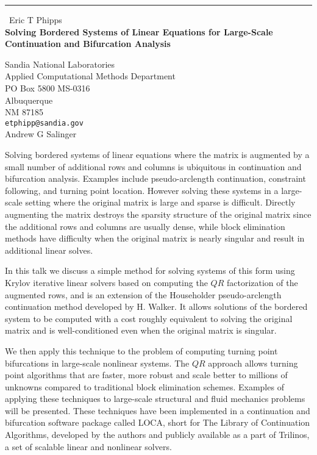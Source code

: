 \documentclass{report}
\begin{document}
\begin{center}
\rule{6in}{1pt} \
{\large Eric T Phipps \\
{\bf Solving Bordered Systems of Linear Equations for Large-Scale Continuation and Bifurcation Analysis}}

Sandia National Laboratories \\ Applied Computational Methods Department \\ PO Box 5800 MS-0316 \\ Albuquerque \\ NM 87185
\\
{\tt etphipp@sandia.gov}\\
Andrew G Salinger\end{center}

Solving bordered systems of linear equations where the matrix is
augmented by a small number of additional rows and columns is ubiquitous
in continuation and bifurcation analysis. Examples include
pseudo-arclength continuation, constraint following, and turning point
location. However solving these systems in a large-scale setting where
the original matrix is large and sparse is difficult. Directly augmenting
the matrix destroys the sparsity structure of the original matrix since
the additional rows and columns are usually dense, while block
elimination methods have difficulty when the original matrix is nearly
singular and result in additional linear solves.

In this talk we discuss a simple method for solving systems of this form
using Krylov iterative linear solvers based on computing the $QR$
factorization of the augmented rows, and is an extension of the
Householder pseudo-arclength continuation method developed by H. Walker.
It allows solutions of the bordered system to be computed with a cost
roughly equivalent to solving the original matrix and is well-conditioned
even when the original matrix is singular.

We then apply this technique to the problem of computing turning point
bifurcations in large-scale nonlinear systems. The $QR$ approach allows
turning point algorithms that are faster, more robust and scale better to
millions of unknowns compared to traditional block elimination schemes.
Examples of applying these techniques to large-scale structural and fluid
mechanics problems will be presented. These techniques have been
implemented in a continuation and bifurcation software package called
LOCA, short for The Library of Continuation Algorithms, developed by the
authors and publicly available as a part of Trilinos, a set of scalable
linear and nonlinear solvers.
\end{document}
